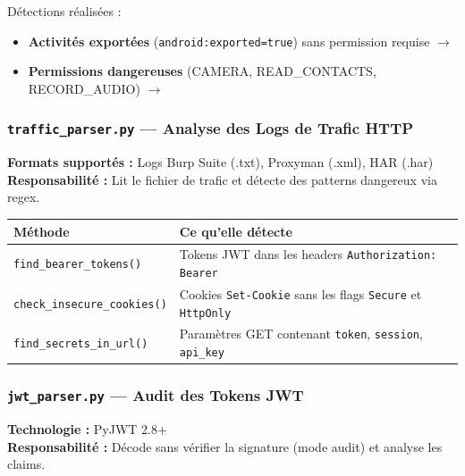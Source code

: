 \documentclass[12pt,a4paper,french]{article}
\newcommand{\file}[1]{\textcolor{primary}{\texttt{#1}}}
\begin{document}
Détections réalisées :

\begin{itemize}[leftmargin=1.5cm]
  \item \textbf{Activités exportées} (\texttt{android:exported=true}) sans permission requise
    $\rightarrow$ 
  \item \textbf{Permissions dangereuses} (CAMERA, READ\_CONTACTS, RECORD\_AUDIO)
    $\rightarrow$ 
\end{itemize}

\subsubsection{\file{traffic\_parser.py} — Analyse des Logs de Trafic HTTP}

\begin{tcolorbox}[toolbox, title={Rôle : Extraction d'artefacts de sécurité depuis les captures réseau}]
\textbf{Formats supportés :} Logs Burp Suite (.txt), Proxyman (.xml), HAR (.har)\\
\textbf{Responsabilité :} Lit le fichier de trafic et détecte des patterns dangereux via regex.
\end{tcolorbox}

\begin{center}
\renewcommand{\arraystretch}{1.3}
\begin{tabular}{lp{8.5cm}}
\toprule
\textbf{Méthode} & \textbf{Ce qu'elle détecte} \\
\midrule
\rowcolor{primary!5}
\texttt{find\_bearer\_tokens()} & Tokens JWT dans les headers \texttt{Authorization: Bearer} \\
\texttt{check\_insecure\_cookies()} & Cookies \texttt{Set-Cookie} sans les flags \texttt{Secure} et \texttt{HttpOnly} \\
\rowcolor{primary!5}
\texttt{find\_secrets\_in\_url()} & Paramètres GET contenant \texttt{token}, \texttt{session}, \texttt{api\_key} \\
\bottomrule
\end{tabular}
\end{center}

\subsubsection{\file{jwt\_parser.py} — Audit des Tokens JWT}

\begin{tcolorbox}[toolbox, title={Rôle : Décodage et analyse de sécurité des JWTs}]
\textbf{Technologie :} PyJWT 2.8+\\
\textbf{Responsabilité :} Décode sans vérifier la signature (mode audit) et analyse les claims.
\end{tcolorbox}
\end{document}
